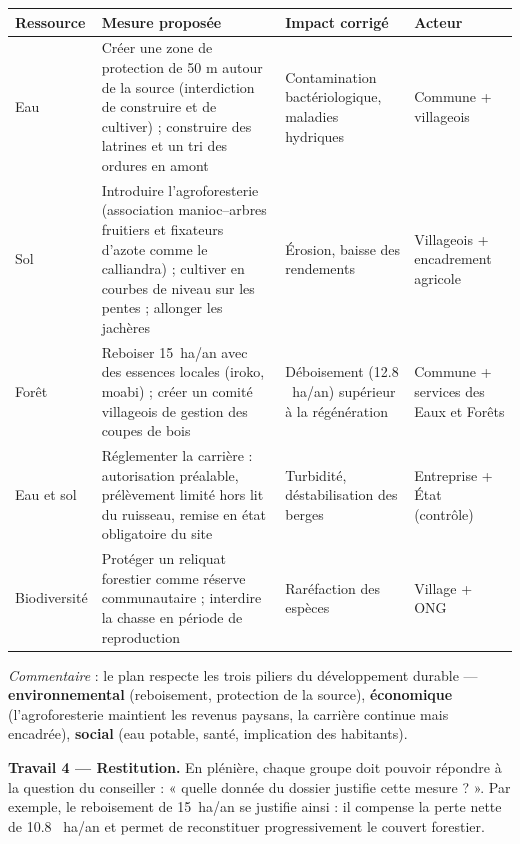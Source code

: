 \documentclass[11pt]{article}
\begin{document}
\begin{exoresolu}
\begin{center}
\begin{tabularx}{\linewidth}{|l|X|X|l|}
\hline
\rowcolor{popblue!40} \textbf{Ressource} & \textbf{Mesure proposée} & \textbf{Impact corrigé} & \textbf{Acteur} \\
\hline
Eau & Créer une zone de protection de 50 m autour de la source (interdiction de construire et de cultiver) ; construire des latrines et un tri des ordures en amont & Contamination bactériologique, maladies hydriques & Commune + villageois \\
\hline
Sol & Introduire l'agroforesterie (association manioc--arbres fruitiers et fixateurs d'azote comme le calliandra) ; cultiver en courbes de niveau sur les pentes ; allonger les jachères & Érosion, baisse des rendements & Villageois + encadrement agricole \\
\hline
Forêt & Reboiser \SI{15}{ha/an} avec des essences locales (iroko, moabi) ; créer un comité villageois de gestion des coupes de bois & Déboisement (\num{12,8} \SI{}{ha/an}) supérieur à la régénération & Commune + services des Eaux et Forêts \\
\hline
Eau et sol & Réglementer la carrière : autorisation préalable, prélèvement limité hors lit du ruisseau, remise en état obligatoire du site & Turbidité, déstabilisation des berges & Entreprise + État (contrôle) \\
\hline
Biodiversité & Protéger un reliquat forestier comme réserve communautaire ; interdire la chasse en période de reproduction & Raréfaction des espèces & Village + ONG \\
\hline
\end{tabularx}
\end{center}

\emph{Commentaire} : le plan respecte les trois piliers du développement durable — \textbf{environnemental} (reboisement, protection de la source), \textbf{économique} (l'agroforesterie maintient les revenus paysans, la carrière continue mais encadrée), \textbf{social} (eau potable, santé, implication des habitants).

\textbf{Travail 4 — Restitution.} En plénière, chaque groupe doit pouvoir répondre à la question du conseiller : « quelle donnée du dossier justifie cette mesure ? ». Par exemple, le reboisement de \SI{15}{ha/an} se justifie ainsi : il compense la perte nette de \num{10,8} \SI{}{ha/an} et permet de reconstituer progressivement le couvert forestier.
\end{exoresolu}
\end{document}
